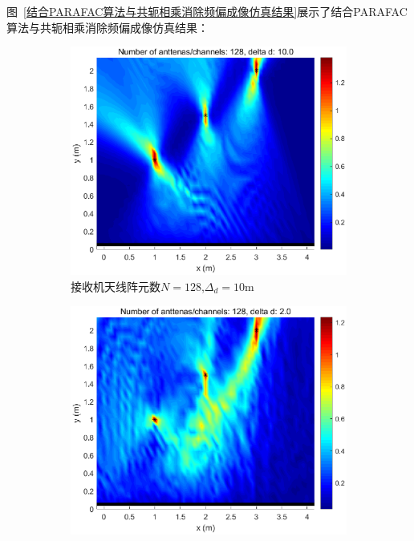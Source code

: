 图~\ref{结合PARAFAC算法与共轭相乘消除频偏成像仿真结果}展示了结合PARAFAC算法与共轭相乘消除频偏成像仿真结果：
\begin{figure}[H]
  \centering
  \begin{subfigure}[t]{.45\linewidth}
      \centering
      \includegraphics[width=1\textwidth]{figures/TPF/N128d10.eps}
      \caption{接收机天线阵元数$N=128$,$\Delta_d = 10\text{m}$}
  \end{subfigure}
  \begin{subfigure}[t]{.45\linewidth}
      \centering
      \includegraphics[width=1\textwidth]{figures/TPF/N128d2.eps}

\end{subfigure}
\end{figure}
